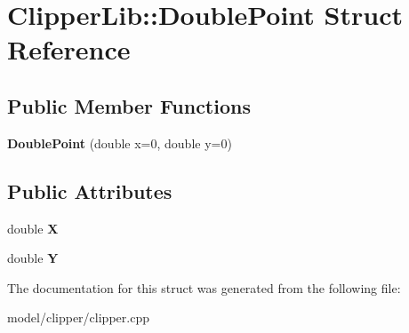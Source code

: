 \hypertarget{structClipperLib_1_1DoublePoint}{\section{Clipper\-Lib\-:\-:Double\-Point Struct Reference}
\label{structClipperLib_1_1DoublePoint}
}
\subsection*{Public Member Functions}
\begin{DoxyCompactItemize}
\item 
\hypertarget{structClipperLib_1_1DoublePoint_a3ccbea6aaf488e0a2d8ac499d2676093}{{\bfseries Double\-Point} (double x=0, double y=0)}\label{structClipperLib_1_1DoublePoint_a3ccbea6aaf488e0a2d8ac499d2676093}

\end{DoxyCompactItemize}
\subsection*{Public Attributes}
\begin{DoxyCompactItemize}
\item 
\hypertarget{structClipperLib_1_1DoublePoint_a675837cc05f20447313789b82d84ad31}{double {\bfseries X}}\label{structClipperLib_1_1DoublePoint_a675837cc05f20447313789b82d84ad31}

\item 
\hypertarget{structClipperLib_1_1DoublePoint_a49774a93540882d88448badf37034454}{double {\bfseries Y}}\label{structClipperLib_1_1DoublePoint_a49774a93540882d88448badf37034454}

\end{DoxyCompactItemize}


The documentation for this struct was generated from the following file\-:\begin{DoxyCompactItemize}
\item 
model/clipper/clipper.\-cpp\end{DoxyCompactItemize}
